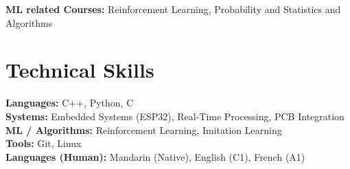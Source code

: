 \documentclass[10pt,a4paper]{article}
\begin{document}
\textbf{ML related Courses:} Reinforcement Learning, Probability and Statistics and Algorithms \\

\section*{Technical Skills}
\textbf{Languages:} C++, Python, C \\
\textbf{Systems:} Embedded Systems (ESP32), Real-Time Processing, PCB Integration \\
\textbf{ML / Algorithms:} Reinforcement Learning, Imitation Learning \\
\textbf{Tools:} Git, Linux\\
\textbf{Languages (Human):} Mandarin (Native), English (C1), French (A1)
\end{document}
